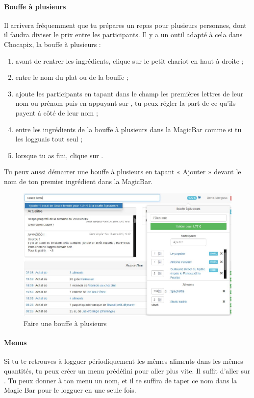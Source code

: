 \documentclass[12pt,french]{article}
\begin{document}
\paragraph{Bouffe à plusieurs} Il arrivera fréquemment que tu prépares un repas pour plusieurs personnes, dont il faudra diviser le prix entre les participants. Il y a un outil adapté à cela dans Chocapix, la bouffe à plusieurs :
\begin{enumerate}
	\item avant de rentrer les ingrédients, clique sur le petit chariot en haut à droite ;
	\item entre le nom du plat ou de la bouffe ;
	\item ajoute les participants en tapant dans le champ les premières lettres de leur nom ou prénom puis en appuyant sur , tu peux régler la part de ce qu'ils payent à côté de leur nom ;
	\item entre les ingrédients de la bouffe à plusieurs dans la MagicBar\texttrademark{} comme si tu les logguais tout seul ;
	\item lorsque tu as fini, clique sur .
\end{enumerate}
Tu peux aussi démarrer une bouffe à plusieurs en tapant « Ajouter » devant le nom de ton premier ingrédient dans la MagicBar\texttrademark{}.

\begin{figure}[h]
\centering
\includegraphics[width=16cm]{images/bouffeaplusieurs}
\caption{Faire une bouffe à plusieurs}
\end{figure}

\paragraph{Menus} Si tu te retrouves à logguer périodiquement les mêmes aliments dans les mêmes quantités, tu peux créer un menu prédéfini pour aller plus vite. Il suffit d'aller sur . Tu peux donner à ton menu un nom, et il te suffira de taper ce nom dans la Magic Bar\texttrademark{} pour le logguer en une seule fois.
\end{document}
